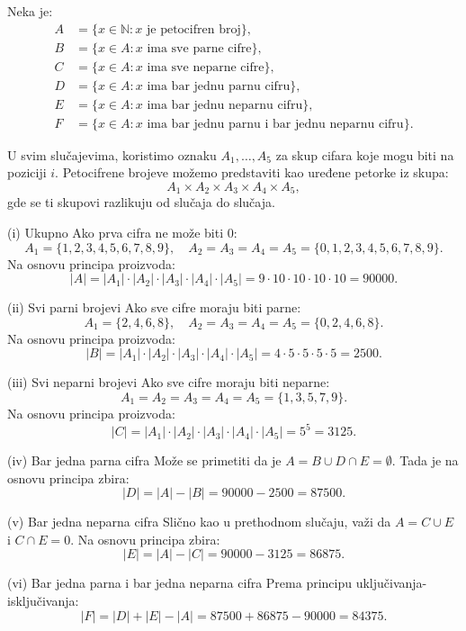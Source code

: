 \documentclass[a4paper,12pt]{article}
\begin{document}
Neka je:
\begin{align*}
    A &= \{x \in \mathbb{N} : x \text{ je petocifren broj}\}, \\
    B &= \{x \in A : x \text{ ima sve parne cifre}\}, \\
    C &= \{x \in A : x \text{ ima sve neparne cifre}\}, \\
    D &= \{x \in A : x \text{ ima bar jednu parnu cifru}\}, \\
    E &= \{x \in A : x \text{ ima bar jednu neparnu cifru}\}, \\
    F &= \{x \in A : x \text{ ima bar jednu parnu i bar jednu neparnu cifru}\}.
\end{align*}

U svim slučajevima, koristimo oznaku \(A_1, \ldots, A_5\) za skup cifara koje mogu biti na poziciji \(i\).  
Petocifrene brojeve možemo predstaviti kao uređene petorke iz skupa:
\[
A_1 \times A_2 \times A_3 \times A_4 \times A_5,
\]
gde se ti skupovi razlikuju od slučaja do slučaja.

(i) Ukupno
Ako prva cifra ne može biti 0:
\[
A_1 = \{1, 2, 3, 4, 5, 6, 7, 8, 9\}, \quad A_2 = A_3 = A_4 = A_5 = \{0, 1, 2, 3, 4, 5, 6, 7, 8, 9\}.
\]
Na osnovu principa proizvoda:
\[
|A| = |A_1| \cdot |A_2| \cdot |A_3| \cdot |A_4| \cdot |A_5| = 9 \cdot 10 \cdot 10 \cdot 10 \cdot 10 = 90000.
\]

(ii) Svi parni brojevi
Ako sve cifre moraju biti parne:
\[
A_1 = \{2, 4, 6, 8\}, \quad A_2 = A_3 = A_4 = A_5 = \{0, 2, 4, 6, 8\}.
\]
Na osnovu principa proizvoda:
\[
|B| = |A_1| \cdot |A_2| \cdot |A_3| \cdot |A_4| \cdot |A_5| = 4 \cdot 5 \cdot 5 \cdot 5 \cdot 5 = 2500.
\]

(iii) Svi neparni brojevi
Ako sve cifre moraju biti neparne:
\[
A_1 = A_2 = A_3 = A_4 = A_5 = \{1, 3, 5, 7, 9\}.
\]
Na osnovu principa proizvoda:
\[
|C| = |A_1| \cdot |A_2| \cdot |A_3| \cdot |A_4| \cdot |A_5| = 5^5 = 3125.
\]

(iv) Bar jedna parna cifra
Može se primetiti da je \(A = B \cup D \cap E = \emptyset\).  
Tada je na osnovu principa zbira:
\[
|D| = |A| - |B| = 90000 - 2500 = 87500.
\]

(v) Bar jedna neparna cifra
Slično kao u prethodnom slučaju, važi da \(A = C \cup E\) i \(C \cap E = 0\).  
Na osnovu principa zbira:
\[
|E| = |A| - |C| = 90000 - 3125 = 86875.
\]

(vi) Bar jedna parna i bar jedna neparna cifra
Prema principu uključivanja-isključivanja:
\[
|F| = |D| + |E| - |A| = 87500 + 86875 - 90000 = 84375.
\]
\end{document}
